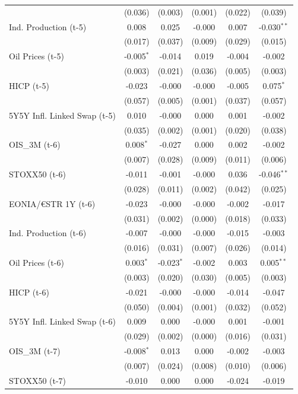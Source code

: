 \begin{longtable}[t]{lccccc}
 & (0.036) & (0.003) & (0.001) & (0.022) & (0.039)\\
Ind. Production (t-5) & 0.008 & 0.025 & -0.000 & 0.007 & -0.030$^{**}$\\
 & (0.017) & (0.037) & (0.009) & (0.029) & (0.015)\\
Oil Prices (t-5) & -0.005$^{*}$ & -0.014 & 0.019 & -0.004 & -0.002\\
 & (0.003) & (0.021) & (0.036) & (0.005) & (0.003)\\
HICP (t-5) & -0.023 & -0.000 & -0.000 & -0.005 & 0.075$^{*}$\\
 & (0.057) & (0.005) & (0.001) & (0.037) & (0.057)\\
5Y5Y Infl. Linked Swap (t-5) & 0.010 & -0.000 & 0.000 & 0.001 & -0.002\\
 & (0.035) & (0.002) & (0.001) & (0.020) & (0.038)\\
OIS\_3M (t-6) & 0.008$^{*}$ & -0.027 & 0.000 & 0.002 & -0.002\\
 & (0.007) & (0.028) & (0.009) & (0.011) & (0.006)\\
STOXX50 (t-6) & -0.011 & -0.001 & -0.000 & 0.036 & -0.046$^{**}$\\
 & (0.028) & (0.011) & (0.002) & (0.042) & (0.025)\\
EONIA/€STR 1Y (t-6) & -0.023 & -0.000 & -0.000 & -0.002 & -0.017\\
 & (0.031) & (0.002) & (0.000) & (0.018) & (0.033)\\
Ind. Production (t-6) & -0.007 & -0.000 & -0.000 & -0.015 & -0.003\\
 & (0.016) & (0.031) & (0.007) & (0.026) & (0.014)\\
Oil Prices (t-6) & 0.003$^{*}$ & -0.023$^{*}$ & -0.002 & 0.003 & 0.005$^{**}$\\
 & (0.003) & (0.020) & (0.030) & (0.005) & (0.003)\\
HICP (t-6) & -0.021 & -0.000 & -0.000 & -0.014 & -0.047\\
 & (0.050) & (0.004) & (0.001) & (0.032) & (0.052)\\
5Y5Y Infl. Linked Swap (t-6) & 0.009 & 0.000 & -0.000 & 0.001 & -0.001\\
 & (0.029) & (0.002) & (0.000) & (0.016) & (0.031)\\
OIS\_3M (t-7) & -0.008$^{*}$ & 0.013 & 0.000 & -0.002 & -0.003\\
 & (0.007) & (0.024) & (0.008) & (0.010) & (0.006)\\
STOXX50 (t-7) & -0.010 & 0.000 & 0.000 & -0.024 & -0.019\\

\end{longtable}
